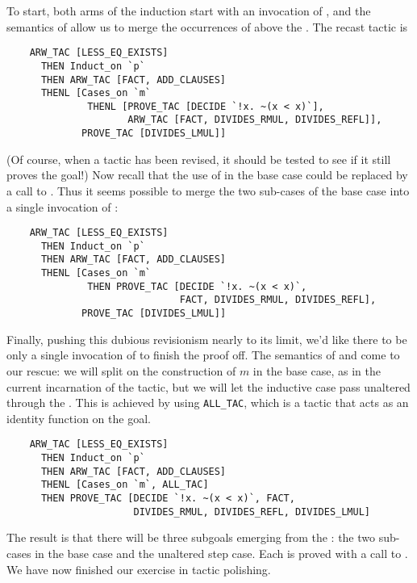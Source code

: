To start, both arms of the induction start with an invocation of
, and the semantics of  allow us to merge the
occurrences of  above the . The recast tactic
is
{\small\begin{verbatim}
    ARW_TAC [LESS_EQ_EXISTS]
      THEN Induct_on `p`
      THEN ARW_TAC [FACT, ADD_CLAUSES]
      THENL [Cases_on `m`
              THENL [PROVE_TAC [DECIDE `!x. ~(x < x)`],
                     ARW_TAC [FACT, DIVIDES_RMUL, DIVIDES_REFL]],
             PROVE_TAC [DIVIDES_LMUL]]
\end{verbatim}}
(Of course, when a tactic has been revised, it should be tested to see
if it still proves the goal!) Now recall that the use of 
in the base case could be replaced by a call to . Thus
it seems possible to merge the two sub-cases of the base case into a
single invocation of :

{\small\begin{verbatim}
    ARW_TAC [LESS_EQ_EXISTS]
      THEN Induct_on `p`
      THEN ARW_TAC [FACT, ADD_CLAUSES]
      THENL [Cases_on `m`
              THEN PROVE_TAC [DECIDE `!x. ~(x < x)`,
                              FACT, DIVIDES_RMUL, DIVIDES_REFL],
             PROVE_TAC [DIVIDES_LMUL]]
\end{verbatim}}

\noindent
Finally, pushing this dubious revisionism nearly to its limit, we'd
like there to be only a single invocation of  to finish
the proof off. The semantics of  and  come to
our rescue: we will split on the construction of $m$ in the base case,
as in the current incarnation of the tactic, but we will let the
inductive case pass unaltered through the . This is achieved
by using \verb+ALL_TAC+, which is a tactic that acts as an identity
function on the goal.
{\small\begin{verbatim}
    ARW_TAC [LESS_EQ_EXISTS]
      THEN Induct_on `p`
      THEN ARW_TAC [FACT, ADD_CLAUSES]
      THENL [Cases_on `m`, ALL_TAC]
      THEN PROVE_TAC [DECIDE `!x. ~(x < x)`, FACT,
                      DIVIDES_RMUL, DIVIDES_REFL, DIVIDES_LMUL]
\end{verbatim}}

\noindent
The result is that there will be three subgoals emerging from the
: the two sub-cases in the base case and the unaltered step
case. Each is proved with a call to . We have now
finished our exercise in tactic polishing.

